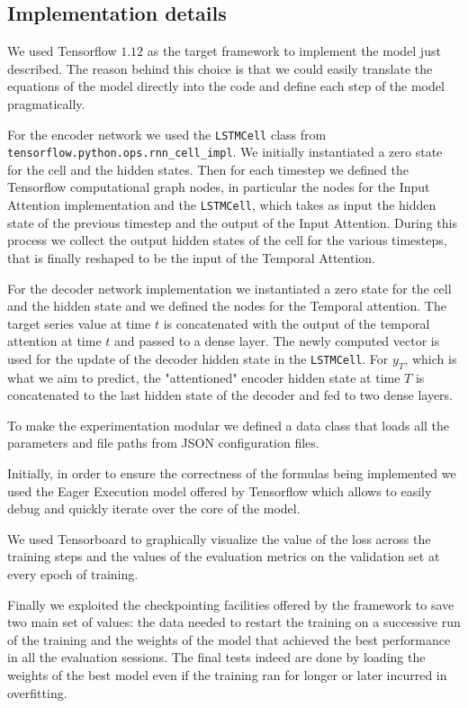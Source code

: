 \documentclass{article}
\begin{document}
\subsection{Implementation details}

We used Tensorflow $1.12$ as the target framework to implement the model just
described. The reason behind this choice is that we
could easily translate the equations of the model directly into the code and
define each step of the model pragmatically.


For the encoder network we used the \texttt{LSTMCell} class from
\texttt{tensorflow.python.ops.rnn\_cell\_impl}.
We initially instantiated a zero state for the cell and the hidden states. Then
for each timestep we defined the Tensorflow computational graph nodes, in particular
the nodes for the Input Attention implementation and the \texttt{LSTMCell}, which takes
as input the hidden state of the previous timestep and the
output of the Input Attention. During this process we collect the output hidden
states of the cell for the various timesteps, that is finally reshaped 
to be the input of the Temporal Attention.

For the decoder network implementation we instantiated a zero state for the cell and 
the hidden state and we defined the nodes for the Temporal attention. The 
target series value at time $t$ is concatenated with the output of the temporal attention
at time $t$ and passed to a dense layer. The newly computed vector is used for the 
update of the decoder hidden state in the \texttt{LSTMCell}. For $y_T$, which 
is what we aim to predict, the "attentioned" encoder hidden state at time $T$
is concatenated to the last hidden state of the decoder and fed to two dense layers.

To make the experimentation modular we defined a data class that loads all
the parameters and file paths from JSON configuration files.

Initially, in order to ensure the correctness of the formulas being implemented 
we used the Eager Execution model offered by Tensorflow which allows to easily
debug and quickly iterate over the core of the model.

We used Tensorboard to graphically visualize the value of the loss across 
the training steps and the values of the evaluation metrics on the validation set 
at every epoch of training. 

Finally we exploited the checkpointing facilities
offered by the framework to save two main set of values: the data needed to 
restart the training on a successive run of the training and the weights of the 
model that achieved the best performance in all the evaluation sessions. The final
tests indeed are done by loading the weights of the best model even if the 
training ran for longer or later incurred in overfitting.
\end{document}
